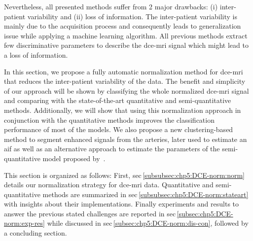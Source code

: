 Nevertheless, all presented methods suffer from 2 major drawbacks:
(i) inter-patient variability and (ii) loss of information.
The inter-patient variability is mainly due to the acquisition process and consequently leads to generalization issue while applying a machine learning algorithm.
All previous methods extract few discriminative parameters to describe the \ac{dce}-\ac{mri} signal which might lead to a loss of information.

In this section, we propose a fully automatic normalization method for \ac{dce}-\ac{mri} that reduces the inter-patient variability of the data.
The benefit and simplicity of our approach will be shown by classifying the whole normalized \ac{dce}-\ac{mri} signal and comparing with the state-of-the-art quantitative and semi-quantitative methods.
Additionally, we will show that using this normalization approach in conjunction with the quantitative methods improves the classification performance of most of the models.
We also propose a new clustering-based method to segment enhanced signals from the arteries, later used to estimate an \ac{aif} as well as an alternative approach to estimate the parameters of the semi-quantitative model proposed by~\cite{huisman2001accurate}.


This section is organized as follows:
First, \acs{sec}\,\ref{subsubsec:chp5:DCE-norm:norm} details our normalization strategy for \ac{dce}-\ac{mri} data.
Quantitative and semi-quantitative methods are summarized in \acs{sec}\,\ref{subsubsec:chp5:DCE-norm:stateart} with insights about their implementations.
Finally experiments and results to answer the previous stated challenges are reported in \acs{sec}\,\ref{subsec:chp5:DCE-norm:exp-res} while discussed in \acs{sec}\,\ref{subsec:chp5:DCE-norm:dis-con}, followed by a concluding section.


